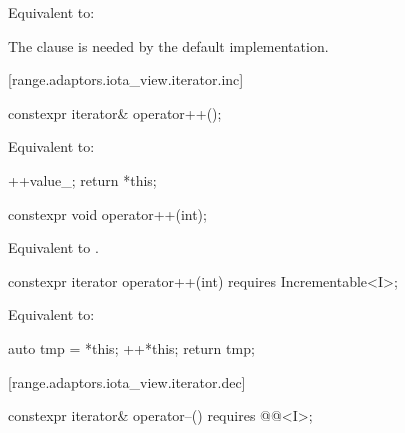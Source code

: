 \begin{addedblock}
\begin{itemdescr}
\pnum
\effects Equivalent to: 

\pnum
\begin{note}
The  clause is needed by the default 
implementation.
\end{note}
\end{itemdescr}

[range.adaptors.iota_view.iterator.inc]{}

\begin{itemdecl}
constexpr iterator& operator++();
\end{itemdecl}

\begin{itemdescr}
\pnum
\effects Equivalent to:
\begin{codeblock}
++value_;
return *this;
\end{codeblock}
\end{itemdescr}

\begin{itemdecl}
constexpr void operator++(int);
\end{itemdecl}

\begin{itemdescr}
\pnum
\effects Equivalent to .
\end{itemdescr}

\begin{itemdecl}
constexpr iterator operator++(int) requires Incrementable<I>;
\end{itemdecl}

\begin{itemdescr}
\pnum
\effects Equivalent to:
\begin{codeblock}
auto tmp = *this;
++*this;
return tmp;
\end{codeblock}
\end{itemdescr}

[range.adaptors.iota_view.iterator.dec]{}

\begin{itemdecl}
constexpr iterator& operator--() requires @@<I>;
\end{itemdecl}


\end{addedblock}
